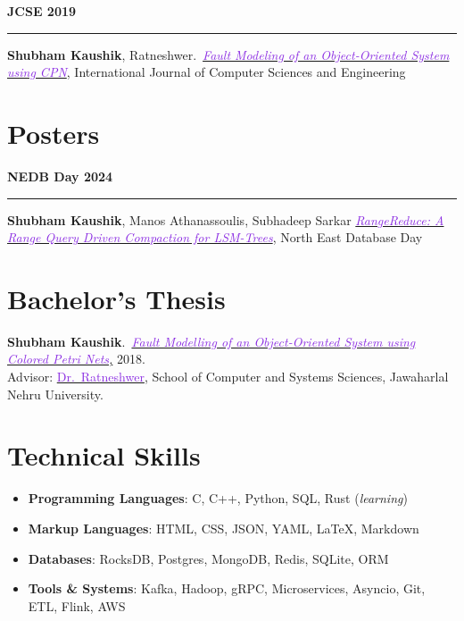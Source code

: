 \documentclass[10pt,a4paper,calibri]{moderncv}
\newcommand{\beforesection}{\vspace{-0.5em}}
\newcommand{\mediumspace}{\vspace{0.5em}}
\newcommand{\publications}[2]{
  \noindent
  \begin{minipage}[c]{0.15\textwidth}
    \centering
      \textbf{#1}
  \end{minipage}%
  \hspace{0.01\textwidth}
  \begin{minipage}[c]{0.02\textwidth}
    \textcolor{lightgray}{\rule{1pt}{0.75cm}}
  \end{minipage}%
  \begin{minipage}[c]{0.80\textwidth}
    \raggedright{
    #2
    }
  \end{minipage}%
}
\begin{document}
\mediumspace

\publications{JCSE 2019}{\textbf{Shubham Kaushik}, Ratneshwer.\ \href{https://doi.org/10.26438/ijcse/v7i5.18281845}{\textit{\textcolor{blueviolet}{Fault 
Modeling of an Object-Oriented System using CPN}}}, International Journal of Computer Sciences and Engineering}

\mediumspace
\beforesection

\section{Posters}
\publications{NEDB Day 2024}{\textbf{Shubham Kaushik}, Manos Athanassoulis, Subhadeep Sarkar \href{https://bu-disc.github.io/nedbday/2024/download/posters/RangeReduce_A_Range_Query_Driven_Compaction_for_LSM-Trees.pdf}{\textit{\textcolor{blueviolet}{RangeReduce: A Range Query Driven Compaction for LSM-Trees}}}, North East Database Day}

\beforesection

\section{Bachelor's Thesis}
\textbf{Shubham Kaushik}.\ \href{https://doi.org/10.26438/ijcse/v7i5.18281845}
{\textit{\textcolor{blueviolet}{Fault Modelling of an Object-Oriented System using Colored Petri Nets},}} 2018.\\
Advisor: \href{https://www.jnu.ac.in/content/ratnesh}{\textcolor{blueviolet}{Dr.\ Ratneshwer}}, 
School of Computer and Systems Sciences, Jawaharlal Nehru University.



\beforesection

\section{Technical Skills}
\begin{itemize}\setlength\itemsep{0.2em}
  \item \textbf{Programming Languages}: C, C++, Python, SQL, Rust (\textit{learning})
  \item \textbf{Markup Languages}: HTML, CSS, JSON, YAML, \LaTeX, Markdown
  \item \textbf{Databases}: RocksDB, Postgres, MongoDB, Redis, SQLite, ORM
  \item \textbf{Tools \& Systems}: Kafka, Hadoop, gRPC, Microservices, Asyncio, Git, ETL, Flink, AWS
\end{itemize}
\end{document}
